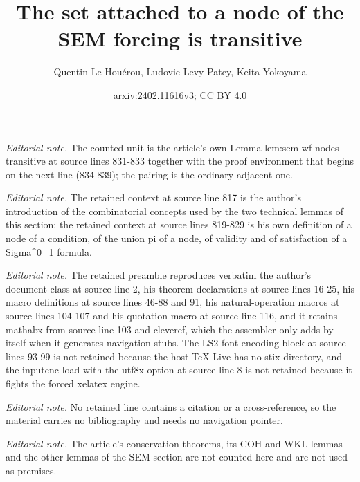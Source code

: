 \documentclass{article}
\title{The set attached to a node of the SEM forcing is transitive}
\author{Quentin Le Houérou, Ludovic Levy Patey, Keita Yokoyama}
\date{arxiv:2402.11616v3; CC BY 4.0}
\numberwithin{theorem}{section}
\begin{document}
\maketitle
\noindent\textit{Editorial note.} The counted unit is the article's own Lemma lem:sem-wf-nodes-transitive at source lines 831-833 together with the proof environment that begins on the next line (834-839); the pairing is the ordinary adjacent one.\par\medskip
\noindent\textit{Editorial note.} The retained context at source line 817 is the author's introduction of the combinatorial concepts used by the two technical lemmas of this section; the retained context at source lines 819-829 is his own definition of a node of a condition, of the union pi of a node, of validity and of satisfaction of a Sigma\textasciicircum{}0\_1 formula.\par\medskip
\noindent\textit{Editorial note.} The retained preamble reproduces verbatim the author's document class at source line 2, his theorem declarations at source lines 16-25, his macro definitions at source lines 46-88 and 91, his natural-operation macros at source lines 104-107 and his quotation macro at source line 116, and it retains mathabx from source line 103 and cleveref, which the assembler only adds by itself when it generates navigation stubs. The LS2 font-encoding block at source lines 93-99 is not retained because the host TeX Live has no stix directory, and the inputenc load with the utf8x option at source line 8 is not retained because it fights the forced xelatex engine.\par\medskip
\noindent\textit{Editorial note.} No retained line contains a citation or a cross-reference, so the material carries no bibliography and needs no navigation pointer.\par\medskip
\noindent\textit{Editorial note.} The article's conservation theorems, its COH and WKL lemmas and the other lemmas of the SEM section are not counted here and are not used as premises.\par\medskip
\end{document}

